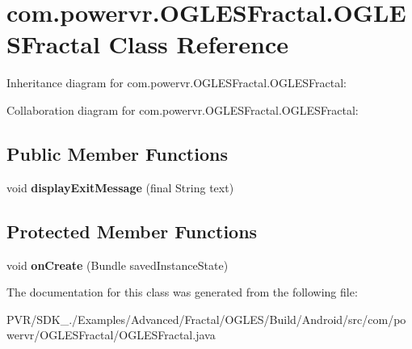 \hypertarget{classcom_1_1powervr_1_1_o_g_l_e_s_fractal_1_1_o_g_l_e_s_fractal}{\section{com.\+powervr.\+O\+G\+L\+E\+S\+Fractal.\+O\+G\+L\+E\+S\+Fractal Class Reference}
\label{classcom_1_1powervr_1_1_o_g_l_e_s_fractal_1_1_o_g_l_e_s_fractal}
}


Inheritance diagram for com.\+powervr.\+O\+G\+L\+E\+S\+Fractal.\+O\+G\+L\+E\+S\+Fractal\+:


Collaboration diagram for com.\+powervr.\+O\+G\+L\+E\+S\+Fractal.\+O\+G\+L\+E\+S\+Fractal\+:
\subsection*{Public Member Functions}
\begin{DoxyCompactItemize}
\item 
\hypertarget{classcom_1_1powervr_1_1_o_g_l_e_s_fractal_1_1_o_g_l_e_s_fractal_a6c07ba71e1ee0f18258c18a0da708e59}{void {\bfseries display\+Exit\+Message} (final String text)}\label{classcom_1_1powervr_1_1_o_g_l_e_s_fractal_1_1_o_g_l_e_s_fractal_a6c07ba71e1ee0f18258c18a0da708e59}

\end{DoxyCompactItemize}
\subsection*{Protected Member Functions}
\begin{DoxyCompactItemize}
\item 
\hypertarget{classcom_1_1powervr_1_1_o_g_l_e_s_fractal_1_1_o_g_l_e_s_fractal_ad3feedda0f76e03556e9655f0c27cc22}{void {\bfseries on\+Create} (Bundle saved\+Instance\+State)}\label{classcom_1_1powervr_1_1_o_g_l_e_s_fractal_1_1_o_g_l_e_s_fractal_ad3feedda0f76e03556e9655f0c27cc22}

\end{DoxyCompactItemize}


The documentation for this class was generated from the following file\+:\begin{DoxyCompactItemize}
\item 
P\+V\+R/\+S\+D\+K\+\_./\+Examples/\+Advanced/\+Fractal/\+O\+G\+L\+E\+S/\+Build/\+Android/src/com/powervr/\+O\+G\+L\+E\+S\+Fractal/O\+G\+L\+E\+S\+Fractal.\+java\end{DoxyCompactItemize}
